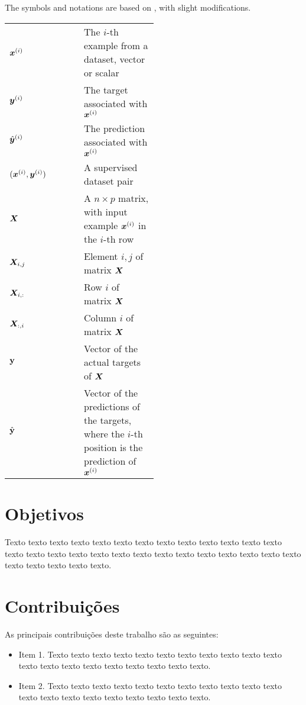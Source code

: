 The symbols and notations are based on \cite{Goodfellow-et-al-2016}, with slight modifications.

\begin{center}
\begin{tabular}{l p{0.5\linewidth}}
$\bm{x}^{(i)}$ & The $i$-th example from a dataset, vector or scalar\\
$\bm{y}^{(i)}$ & The target associated with $\bm{x}^{(i)}$\\
$\hat{\bm{y}}^{(i)}$ & The prediction associated with $\bm{x}^{(i)}$ \\
$(\bm{x}^{(i)},\bm{y}^{(i)})$ & A supervised dataset pair\\
$\bm{X}$ & A $n \times p$ matrix, with input example $\bm{x}^{(i)}$ in the $i$-th row\\
$\bm{X}_{i,j}$ & Element $i, j$ of matrix $\bm{X}$ \\
$\bm{X}_{i, :}$ & Row $i$ of matrix  $\bm{X}$ \\
$\bm{X}_{:, i}$ & Column $i$ of matrix $\bm{X}$ \\
$\textbf{\text{\textup{y}}}$ & Vector of the actual targets of $\bm{X}$\\
$\hat{\textbf{{\text{\textup{y}}}}}$ & Vector of the predictions of the targets, where the $i$-th position is the prediction of $\bm{x}^{(i)}$\\

\end{tabular}
\end{center}


\section{Objetivos}
\label{sec:objetivo}

Texto texto texto texto texto texto texto texto texto texto texto texto texto
texto texto texto texto texto texto texto texto texto texto texto texto texto
texto texto texto texto texto texto.

\section{Contribuições}
\label{sec:contribucoes}

As principais contribuições deste trabalho são as seguintes:

\begin{itemize}
  \item Item 1. Texto texto texto texto texto texto texto texto texto texto
  texto texto texto texto texto texto texto texto texto texto.

  \item Item 2. Texto texto texto texto texto texto texto texto texto texto
  texto texto texto texto texto texto texto texto texto texto.

\end{itemize}

